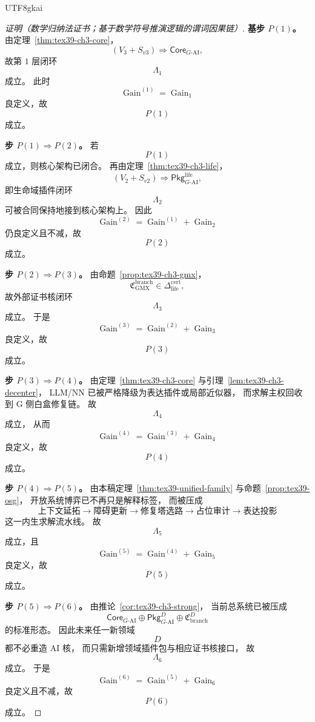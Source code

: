 \documentclass[12pt]{article}
\begin{document}
\begin{CJK*}{UTF8}{gkai}
\begin{proof}[证明（数学归纳法证书；基于数学符号推演逻辑的谓词因果链）]
\textbf{基步 $P(1)$。}
由定理~\ref{thm:tex39-ch3-core}，
\[
  (V_3+S_{v3})
  \Longrightarrow
  \mathsf{Core}_{G\text{-AI}},
\]
故第 $1$ 层闭环
\[
  \Lambda_1
\]
成立。
此时
\[
  \operatorname{Gain}^{(1)}
  =
  \operatorname{Gain}_1
\]
良定义，故
\[
  P(1)
\]
成立。

\textbf{步 $P(1)\Rightarrow P(2)$。}
若
\[
  P(1)
\]
成立，则核心架构已闭合。
再由定理~\ref{thm:tex39-ch3-life}，
\[
  (V_2+S_{v2})
  \Longrightarrow
  \mathsf{Pkg}_{G\text{-AI}}^{\mathrm{life}},
\]
即生命域插件闭环
\[
  \Lambda_2
\]
可被合同保持地接到核心架构上。
因此
\[
  \operatorname{Gain}^{(2)}
  =
  \operatorname{Gain}^{(1)}
  +
  \operatorname{Gain}_2
\]
仍良定义且不减，故
\[
  P(2)
\]
成立。

\textbf{步 $P(2)\Rightarrow P(3)$。}
由命题~\ref{prop:tex39-ch3-gmx}，
\[
  \mathfrak C_{\mathrm{GMX}}^{\mathrm{branch}}
  \in
  \Delta_{\mathrm{life}}^{\mathrm{cert}},
\]
故外部证书核闭环
\[
  \Lambda_3
\]
成立。
于是
\[
  \operatorname{Gain}^{(3)}
  =
  \operatorname{Gain}^{(2)}
  +
  \operatorname{Gain}_3
\]
良定义，故
\[
  P(3)
\]
成立。

\textbf{步 $P(3)\Rightarrow P(4)$。}
由定理~\ref{thm:tex39-ch3-core}
与引理~\ref{lem:tex39-ch3-decenter}，
LLM/NN 已被严格降级为表达插件或局部近似器，
而求解主权回收到 G 侧白盒修复链。
故
\[
  \Lambda_4
\]
成立，
从而
\[
  \operatorname{Gain}^{(4)}
  =
  \operatorname{Gain}^{(3)}
  +
  \operatorname{Gain}_4
\]
良定义，故
\[
  P(4)
\]
成立。

\textbf{步 $P(4)\Rightarrow P(5)$。}
由本稿定理~\ref{thm:tex39-unified-family}
与命题~\ref{prop:tex39-osg}，
开放系统博弈已不再只是解释标签，
而被压成
\[
  \text{上下文延拓}
  \to
  \text{障碍更新}
  \to
  \text{修复塔选路}
  \to
  \text{占位审计}
  \to
  \text{表达投影}
\]
这一内生求解流水线。
故
\[
  \Lambda_5
\]
成立，且
\[
  \operatorname{Gain}^{(5)}
  =
  \operatorname{Gain}^{(4)}
  +
  \operatorname{Gain}_5
\]
良定义，故
\[
  P(5)
\]
成立。

\textbf{步 $P(5)\Rightarrow P(6)$。}
由推论~\ref{cor:tex39-ch3-strong}，
当前总系统已被压成
\[
  \mathsf{Core}_{G\text{-AI}}
  \oplus
  \mathsf{Pkg}_{G\text{-AI}}^{D}
  \oplus
  \mathfrak C_{\mathrm{branch}}^{D}
\]
的标准形态。
因此未来任一新领域
\[
  D
\]
都不必重造 AI 核，
而只需新增领域插件包与相应证书核接口，
故
\[
  \Lambda_6
\]
成立。
于是
\[
  \operatorname{Gain}^{(6)}
  =
  \operatorname{Gain}^{(5)}
  +
  \operatorname{Gain}_6
\]
良定义且不减，故
\[
  P(6)
\]
成立。


\end{proof}
\end{CJK*}
\end{document}
